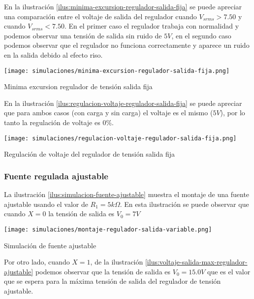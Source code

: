 En la ilustración \ref{ilus:minima-excursion-regulador-salida-fija} se puede apreciar una comparación entre el voltaje de salida del regulador cuando $V_{srms} > 7.50$ y cuando $V_{srms} < 7.50$. En el primer caso el regulador trabaja con normalidad y podemos observar una tensión de salida sin ruido de $5V$, en el segundo caso podemos observar que el regulador no funciona correctamente y aparece un ruido en la salida debido al efecto riso.

\begin{ilustracion}[ht]
    \centering
    \texttt{[image: simulaciones/minima-excursion-regulador-salida-fija.png]}
    \caption{Minima excursion regulador de tensión salida fija}
    \label{ilus:minima-excursion-regulador-salida-fija}
\end{ilustracion}

En la ilustración \ref{ilus:regulacion-voltaje-regulador-salida-fija} se puede apreciar que para ambos casos (con carga y sin carga) el voltaje es el mismo ($5V$), por lo tanto la regulación de voltaje es 0\%.

\begin{ilustracion}[ht]
    \centering
    \texttt{[image: simulaciones/regulacion-voltaje-regulador-salida-fija.png]}
    \caption{Regulación de voltaje del regulador de tensión salida fija}
    \label{ilus:regulacion-voltaje-regulador-salida-fija}
\end{ilustracion}

\FloatBarrier
\subsubsection*{Fuente regulada ajustable}

La ilustración \ref{ilus:simulacion-fuente-ajustable} muestra el montaje de una fuente ajustable usando el valor de $R_1 = 5k \Omega$. En esta ilustración se puede observar que cuando $X=0$ la tensión de salida es $V_0 = 7 V$

\begin{ilustracion}[ht]
    \centering
    \texttt{[image: simulaciones/montaje-regulador-salida-variable.png]}
    \caption{Simulación de fuente ajustable}
    \label{ilus:simulacion-fuente-ajustable}
\end{ilustracion}

Por otro lado, cuando $X=1$, de la ilustración \ref{ilus:voltaje-salida-max-regulador-ajustable} podemos observar que la tensión de salida es $V_0 = 15.0 V$ que es el valor que se espera para la máxima tensión de salida del regulador de tensión ajustable.


